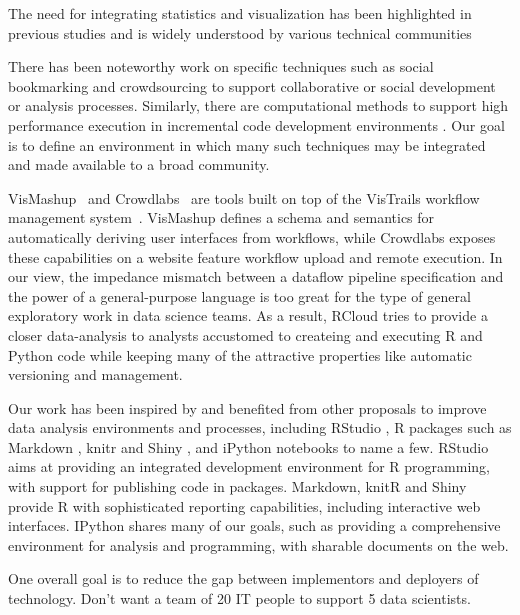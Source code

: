 The need for integrating statistics and visualization has been
highlighted in previous studies and is widely understood by
various technical communities \cite{Perer:2008:ISA}

There has been noteworthy work on specific techniques such as
social bookmarking \cite{Millen:2006:DSB} \cite{Heer:2007:VAV}
and crowdsourcing \cite{Fast:2014:ECS} to support collaborative
or social development or analysis processes.
Similarly, there are computational methods to support high
performance execution in incremental code development
environments \cite{Guo:2010:TPI}.
Our goal is to define an environment in which many such
techniques may be integrated and made available to a broad community.

VisMashup~\cite{Santos:2009:VST} and Crowdlabs~\cite{Mates:2011:CSA}
are tools built on top of the VisTrails workflow management
system~\cite{Callahan:2006:VVM}. VisMashup defines a schema and
semantics for automatically deriving user interfaces from workflows,
while Crowdlabs exposes these capabilities on a website feature
workflow upload and remote execution. In our view, the impedance
mismatch between a dataflow pipeline specification and the power of a
general-purpose language is too great for the type of general
exploratory work in data science teams. As a result, RCloud tries to
provide a closer data-analysis to analysts accustomed to createing and
executing R and Python code while keeping many of the attractive
properties like automatic versioning and management.

Our work has been inspired by and benefited from other proposals
to improve data analysis environments and processes,
including RStudio \cite{RStudio:2013:SWA},
R packages such as Markdown \cite{Allaire:2014:MMR},
knitr \cite{Xie:2013:DDW}
and Shiny \cite{RStudio:2013:SWA},
and iPython notebooks \cite{Perez:2007:IAS}
to name a few. RStudio aims at providing an integrated development environment
for R programming, with support for publishing code in packages. Markdown,
knitR and Shiny provide R with sophisticated reporting capabilities, including
interactive web interfaces. IPython \cite{Perez:2007:IAS}
shares many of our goals, such as providing a comprehensive environment
for analysis and programming, with sharable documents on the web.

One overall goal is to reduce the gap between implementors and deployers
of technology. Don't want a team of 20 IT people to support 5 data scientists.

